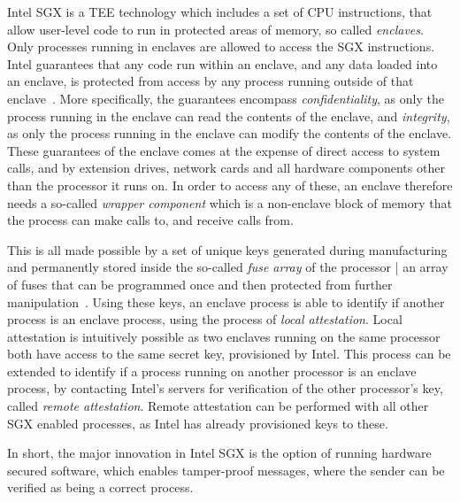\documentclass{article}
\begin{document}
		Intel SGX is a TEE technology which includes a set of CPU instructions, that allow user-level code to run in protected areas of memory, so called \textit{enclaves}.
		Only processes running in enclaves are allowed to access the SGX instructions.
		Intel guarantees that any code run within an enclave, and any data loaded into an enclave, is protected from access by any process running outside of that enclave~\cite{intel_sgx}.
		More specifically, the guarantees encompass \textit{confidentiality}, as only the process running in the enclave can read the contents of the enclave, and \textit{integrity}, as only the process running in the enclave can modify the contents of the enclave.
		These guarantees of the enclave comes at the expense of direct access to system calls, and by extension drives, network cards and all hardware components other than the processor it runs on.
		In order to access any of these, an enclave therefore needs a so-called \textit{wrapper component} which is a non-enclave block of memory that the process can make calls to, and receive calls from.

		This is all made possible by a set of unique keys generated during manufacturing and permanently stored inside the so-called \textit{fuse array} of the processor | an array of fuses that can be programmed once and then protected from further manipulation~\cite{robson_electrically_2007}.
		Using these keys, an enclave process is able to identify if another process is an enclave process, using the process of \textit{local attestation}.
		Local attestation is intuitively possible as two enclaves running on the same processor both have access to the same secret key, provisioned by Intel.
		This process can be extended to identify if a process running on another processor is an enclave process, by contacting Intel's servers for verification of the other processor's key, called \textit{remote attestation}.
		Remote attestation can be performed with all other SGX enabled processes, as Intel has already provisioned keys to these.

		In short, the major innovation in Intel SGX is the option of running hardware secured software, which enables tamper-proof messages, where the sender can be verified as being a correct process.
\end{document}
